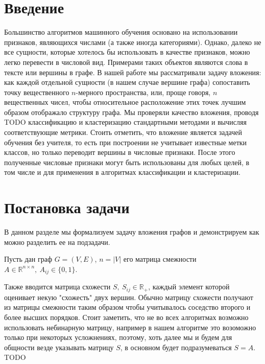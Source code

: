 \documentclass[12pt,a4paper]{extarticle}
\newcommand{\R}{\mathbb{R}}
\begin{document}
    \tableofcontents

    \newpage

    \section{Введение}
    Большинство алгоритмов машинного обучения основано на использовании
    признаков, являющихся числами (а также иногда категориями).
    Однако, далеко не все сущности, которые хотелось бы использовать в качестве признаков,
    можно легко перевести в числовой вид.
    Примерами таких объектов являются слова в тексте или вершины в графе.
    В нашей работе мы рассматривали задачу вложения: как каждой отдельной сущности (в нашем
    случае вершине графа) сопоставить точку вещественного $n$-мерного пространства,
    или, проще говоря, $n$ вещественных чисел, чтобы относительное
    расположение этих точек лучшим образом отображало структуру графа.
    Мы проверяли качество вложения, проводя TODO классификацию и кластеризацию
    стандартными методами и вычисляя соответствующие метрики.
    Стоить отметить, что вложение является задачей обучения без учителя,
    то есть при построении не учитывает известные метки классов, но только
    переводит вершины в числовые признаки.
    После этого полученные числовые признаки могут быть использованы для любых целей, в том числе и для
    применения в алгоритмах классификации и кластеризации.

    \section{Постановка задачи}
    В данном разделе мы формализуем задачу вложения графов и демонстрируем как можно разделить ее на подзадачи.

    Пусть дан граф $G = (V, E)$, $n = |V|$ его матрица смежности $A \in \R^{n \times n},\ A_{ij} \in \{0, 1\}$.
    
    Также вводится матрица схожести $S,\ S_{ij} \in \R_{+}$,  каждый элемент которой оценивает некую "схожесть" двух вершин. Обычно матрицу схожести получают из матрицы смежности таким образом чтобы учитывалось соседство второго и более высших порядков. Стоит заметить, что не во всех алгоритмах возможно использовать небинарную матрицу, например в нашем алгоритме это возоможно только при некоторых усложнениях, поэтому, хоть далее мы и будем для общности везде указывать матрицу $S$, в основном будет подразумеваться $S = A$. TODO
    
\end{document}
